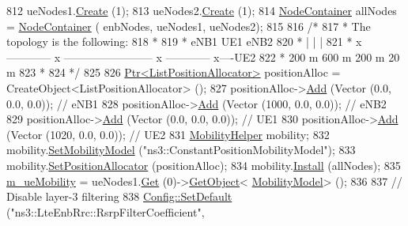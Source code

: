 \begin{DoxyCode}
812   ueNodes1.\hyperlink{classns3_1_1NodeContainer_a787f059e2813e8b951cc6914d11dfe69}{Create} (1);
813   ueNodes2.\hyperlink{classns3_1_1NodeContainer_a787f059e2813e8b951cc6914d11dfe69}{Create} (1);
814   \hyperlink{classns3_1_1NodeContainer}{NodeContainer} allNodes = \hyperlink{classns3_1_1NodeContainer}{NodeContainer} ( enbNodes, ueNodes1, ueNodes2);
815 
816   \textcolor{comment}{/*}
817 \textcolor{comment}{   * The topology is the following:}
818 \textcolor{comment}{   *}
819 \textcolor{comment}{   *  eNB1            UE1                                      eNB2}
820 \textcolor{comment}{   *    |              |                                         |}
821 \textcolor{comment}{   *    x ------------ x ------------------------ x ------------ x----UE2}
822 \textcolor{comment}{   *         200 m               600 m                  200 m      20 m}
823 \textcolor{comment}{   *}
824 \textcolor{comment}{   */}
825 
826   \hyperlink{classns3_1_1Ptr}{Ptr<ListPositionAllocator>} positionAlloc = CreateObject<ListPositionAllocator> 
      ();
827   positionAlloc->\hyperlink{classns3_1_1ListPositionAllocator_a460e82f015ac012a73ba0ea0cccb3486}{Add} (Vector (0.0, 0.0, 0.0));   \textcolor{comment}{// eNB1}
828   positionAlloc->\hyperlink{classns3_1_1ListPositionAllocator_a460e82f015ac012a73ba0ea0cccb3486}{Add} (Vector (1000, 0.0, 0.0)); \textcolor{comment}{// eNB2}
829   positionAlloc->\hyperlink{classns3_1_1ListPositionAllocator_a460e82f015ac012a73ba0ea0cccb3486}{Add} (Vector (0.0, 0.0, 0.0));  \textcolor{comment}{// UE1}
830   positionAlloc->\hyperlink{classns3_1_1ListPositionAllocator_a460e82f015ac012a73ba0ea0cccb3486}{Add} (Vector (1020, 0.0, 0.0));  \textcolor{comment}{// UE2}
831   \hyperlink{classns3_1_1MobilityHelper}{MobilityHelper} mobility;
832   mobility.\hyperlink{classns3_1_1MobilityHelper_a030275011b6f40682e70534d30280aba}{SetMobilityModel} (\textcolor{stringliteral}{"ns3::ConstantPositionMobilityModel"});
833   mobility.\hyperlink{classns3_1_1MobilityHelper_ac59d5295076be3cc11021566713a28c5}{SetPositionAllocator} (positionAlloc);
834   mobility.\hyperlink{classns3_1_1MobilityHelper_a07737960ee95c0777109cf2994dd97ae}{Install} (allNodes);
835   \hyperlink{classLteFrAreaTestCase_ae2f235fc4d87154ef9f32bc0d92ef2ca}{m\_ueMobility} = ueNodes1.\hyperlink{classns3_1_1NodeContainer_a9ed96e2ecc22e0f5a3d4842eb9bf90bf}{Get} (0)->\hyperlink{classns3_1_1Object_a13e18c00017096c8381eb651d5bd0783}{GetObject}<
      \hyperlink{classns3_1_1MobilityModel}{MobilityModel}> ();
836 
837   \textcolor{comment}{// Disable layer-3 filtering}
838   \hyperlink{group__config_ga2e7882df849d8ba4aaad31c934c40c06}{Config::SetDefault} (\textcolor{stringliteral}{"ns3::LteEnbRrc::RsrpFilterCoefficient"},

\end{DoxyCode}
